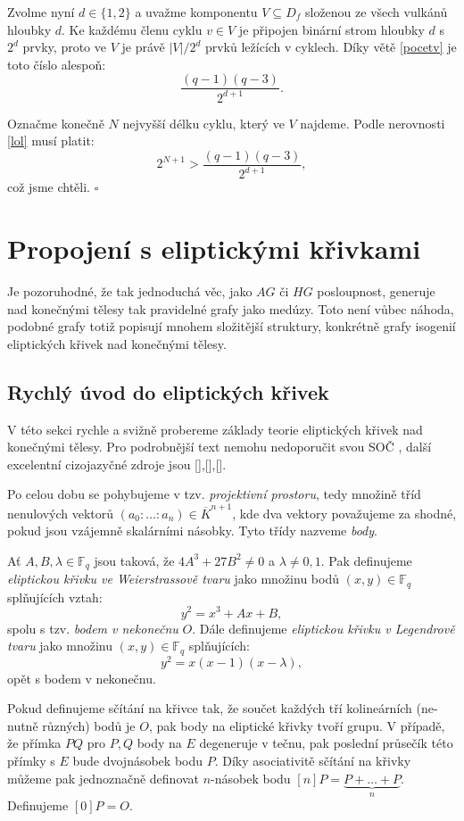 \documentclass[12pt]{report}
\begin{document}
Zvolme nyní $d \in \lbrace 1,2 \rbrace$ a uvažme komponentu $V \subseteq D_f$ složenou ze všech vulkánů hloubky $d$. Ke každému členu cyklu $v \in V$ je připojen binární strom hloubky $d$ s $2^d$ prvky, proto ve $V$ je právě $\vert V \vert/2^d$ prvků ležících v cyklech. Díky větě \ref{pocetv} je toto číslo alespoň:
$$\frac{(q-1)(q-3)}{2^{d+1}}.$$

Označme konečně $N$ nejvyšší délku cyklu, který ve $V$ najdeme. Podle nerovnosti \eqref{lol} musí platit:
$$2^{N+1} > \frac{(q-1)(q-3)}{2^{d+1}},$$
což jsme chtěli. \hfill $\square$\\ 




\chapter{Propojení s eliptickými křivkami}\label{ctyri}

Je pozoruhodné, že tak jednoduchá věc, jako $AG$ či $HG$ posloupnost, generuje nad konečnými tělesy tak pravidelné grafy jako medúzy. Toto není vůbec náhoda, podobné grafy totiž popisují mnohem složitější struktury, konkrétně grafy isogenií eliptických křivek nad konečnými tělesy.

\section{Rychlý úvod do eliptických křivek}
V této sekci rychle a svižně probereme základy teorie eliptických křivek nad konečnými tělesy. Pro podrobnější text nemohu nedoporučit svou SOČ \cite{Pezlar}, další excelentní cizojazyčné zdroje jsou [],[],[].

Po celou dobu se pohybujeme v tzv. \textit{projektivní prostoru}, tedy množině tříd nenulových vektorů $(a_0: \dots: a_n) \in \overline{K}^{n+1}$, kde dva vektory považujeme za shodné, pokud jsou vzájemně skalárními násobky. Tyto třídy nazveme \textit{body}.


\begin{definice}
Ať $A,B,\lambda \in \mathbb{F}_q$ jsou taková, že $4 A^3 + 27 B^2 \neq 0$ a $\lambda \neq 0, 1.$ Pak definujeme \textit{eliptickou křivku ve Weierstrassově tvaru} jako množinu bodů $(x,y) \in \mathbb{F}_q$ splňujících vztah:
$$y^2 = x^3 + Ax + B,$$
spolu s tzv. \textit{bodem v nekonečnu} $O$. Dále definujeme \textit{eliptickou křivku v Legendrově tvaru} jako množinu $(x,y) \in \mathbb{F}_q$ splňujících:
$$y^2 = x(x-1)(x-\lambda),$$
opět s bodem v nekonečnu.
\end{definice}
Pokud definujeme sčítání na křivce tak, že součet každých tří kolineárních (ne-nutně různých) bodů je $O$, pak body na eliptické křivky tvoří grupu. V případě, že přímka $PQ$ pro $P,Q$ body na $E$ degeneruje v tečnu, pak poslední průsečík této přímky s $E$ bude dvojnásobek bodu $P$. Díky asociativitě sčítání na křivky můžeme pak jednoznačně definovat $n$-násobek bodu $[n]P = \underbrace{P+\dots+P}_{n}$. Definujeme $[0]P = O$.
\end{document}
